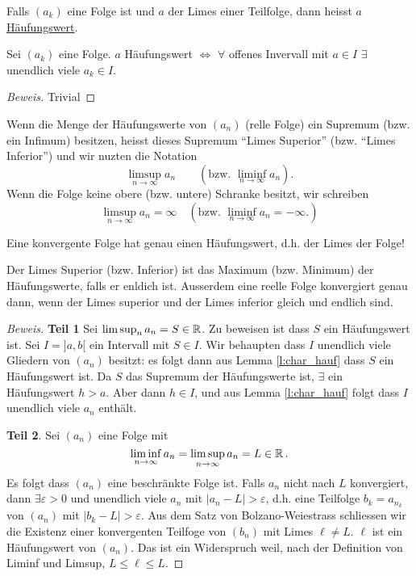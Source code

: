 \begin{Def}
  Falls $(a_k)$ eine Folge ist und $a$ der Limes einer Teilfolge, dann heisst $a$ \ul{Häufungswert}.
\end{Def}
\begin{Lem}\label{l:char_hauf}
  Sei $(a_k)$ eine Folge. $a$ Häufungswert $\iff$ 
$\forall$ offenes Invervall mit $a\in I$ $\exists$ unendlich viele $a_k\in I$.
\end{Lem}
\begin{proof}[Beweis]
Trivial \end{proof}
\begin{Def}
Wenn die Menge der Häufungswerte von $(a_n)$ (relle Folge) ein Supremum 
(bzw. ein Infimum) besitzen, heisst dieses Supremum 
``Limes Superior'' (bzw. ``Limes Inferior'') und wir nuzten die Notation
\[\limsup_{n\to\infty} a_n 
\qquad (\mbox{bzw. } \liminf_{n\to\infty} a_n).\]
Wenn die Folge keine obere (bzw. untere) Schranke besitzt,
wir schreiben
\[ \limsup_{n\to \infty} a_n = \infty \quad
 (\mbox{bzw. } \liminf_{n\to\infty} a_n = -\infty.)
\]
\end{Def}

\begin{Bem}
Eine konvergente Folge hat genau einen H\"aufungswert, d.h.
der Limes der Folge! 
\end{Bem}

\begin{Lem}
Der Limes Superior (bzw. Inferior) ist das Maximum (bzw. Minimum) 
der Häufungswerte, falls er enldich ist. 
Ausserdem eine reelle Folge konvergiert genau
dann, wenn der Limes superior und der Limes inferior gleich und endlich
sind.
\end{Lem}
\begin{proof}[Beweis]
{\bf Teil 1} Sei $\limsup_n a_n= S\in \mathbb{R}$. Zu beweisen
ist dass $S$ ein H\"aufungswert ist. Sei $I=]a,b[$ ein Intervall mit
$S\in I$. Wir behaupten dass $I$
unendlich viele Gliedern von $(a_n)$ besitzt: es folgt dann
aus Lemma \ref{l:char_hauf} dass $S$ ein H\"aufungswert ist. Da $S$ das Supremum
der H\"aufungswerte ist, $\exists$ ein H\"aufungswert $h >a$. 
Aber dann $h\in I$, und aus Lemma \ref{l:char_hauf}
folgt dass $I$ unendlich viele $a_n$ enth\"alt. 

\medskip

{\bf Teil 2}. Sei $(a_n)$ eine Folge mit
\[
 \liminf_{n\to\infty} a_n = \limsup_{n\to \infty} a_n = L \in \mathbb{R}\, .
\]
Es folgt dass $(a_n)$ eine beschr\"ankte Folge ist. Falls
$a_n$ nicht nach $L$ konvergiert, dann $\exists \varepsilon >0$
und unendlich viele $a_n$ mit $|a_n-L|>\varepsilon$, d.h. eine
Teilfolge $b_k=a_{n_k}$ von $(a_n)$ mit $|b_k-L|>\varepsilon$.
Aus dem Satz von Bolzano-Weiestrass schliessen wir die Existenz
einer konvergenten Teilfoge von $(b_n)$ mit Limes $\ell\neq L$.
$\ell$ ist ein H\"aufungswert von $(a_n)$. Das ist ein Widerspruch
weil, nach der Definition von Liminf und Limsup, $L\leq \ell \leq L$.
\end{proof}



